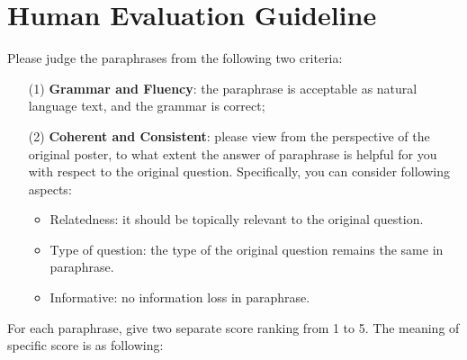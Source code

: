 \documentclass[11pt,a4paper]{article}
\begin{document}
\section{Human Evaluation Guideline}
Please judge the paraphrases from the following two criteria:
\begin{itemize}[leftmargin=18pt,topsep=1pt]
  \setlength \itemsep{-0.1em}
  \item[(1)] {\bf Grammar and Fluency}: the paraphrase is acceptable as natural language text, and the grammar is correct;
  \item[(2)] {\bf Coherent and Consistent}: please view from the perspective of the original poster, to what extent the answer of paraphrase is
      helpful for you with respect to the original question. Specifically, you can consider following aspects:
      \begin{itemize}
        \item Relatedness: it should be topically relevant to the original question.
        \item Type of question: the type of the original question remains the same in paraphrase.
        \item Informative: no information loss in paraphrase.
      \end{itemize}
\end{itemize}
For each paraphrase, give two separate score ranking from 1 to 5. The meaning of specific score is as following:
\end{document}
